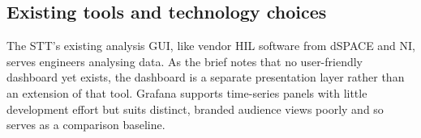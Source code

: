 \subsection{Existing tools and technology choices}\label{subsec:tech}
The STT's existing analysis GUI, like vendor HIL software from dSPACE and NI, serves engineers analysing data.
As the brief notes that no user-friendly dashboard yet exists, the dashboard is a separate presentation layer rather than an extension of that tool.
Grafana supports time-series panels with little development effort but suits distinct, branded audience views poorly and so serves as a comparison baseline.
